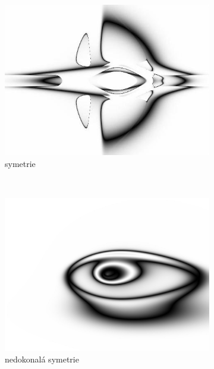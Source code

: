 \documentclass[a4]{article}
\begin{document}
\begin{figure}
    \centering
    \begin{subfigure}[b]{0.3\textwidth}
        \includegraphics[width=\textwidth]{cppn1}
        \caption{symetrie}
        \label{fig:sym}
    \end{subfigure}
    ~ 
    \begin{subfigure}[b]{0.3\textwidth}
        \includegraphics[width=\textwidth]{cppn2}
        \caption{nedokonalá symetrie}
        \label{fig:imperfectsym}
    \end{subfigure}
    ~ 
    \begin{subfigure}[b]{0.3\textwidth}

\end{subfigure}
\end{figure}
\end{document}

